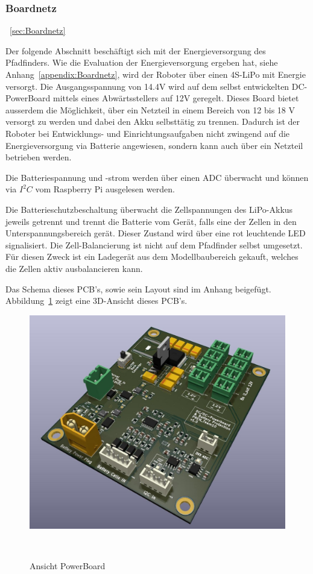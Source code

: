 \documentclass[main.tex]{subfiles} %
\begin{document}

\subsubsection{Boardnetz}~\ref{sec:Boardnetz}

Der folgende Abschnitt beschäftigt sich mit der Energieversorgung des
Pfadfinders. Wie die Evaluation der Energieversorgung ergeben hat, siehe
Anhang~\ref{appendix:Boardnetz}, wird der Roboter über einen 4S-LiPo mit
Energie versorgt. Die Ausgangsspannung von 14.4V wird auf dem selbst
entwickelten DC-PowerBoard mittels eines Abwärtsstellers auf 12V geregelt.
Dieses Board bietet ausserdem die Möglichkeit, über ein Netzteil in einem
Bereich von 12 bis 18 V versorgt zu werden und dabei den Akku selbsttätig zu
trennen. Dadurch ist der Roboter bei Entwicklungs- und Einrichtungsaufgaben
nicht zwingend auf die Energieversorgung via Batterie angewiesen, sondern kann
auch über ein Netzteil betrieben werden.

Die Batteriespannung und -strom werden über einen ADC überwacht und können via
$I^2C$ vom Raspberry Pi ausgelesen werden.

Die Batterieschutzbeschaltung überwacht die Zellspannungen des LiPo-Akkus
jeweils getrennt und trennt die Batterie vom Gerät, falls eine der Zellen in
den Unterspannungsbereich gerät. Dieser Zustand wird über eine rot leuchtende
LED signalisiert. Die Zell-Balancierung ist nicht auf dem Pfadfinder selbst
umgesetzt. Für diesen Zweck ist ein Ladegerät aus dem Modellbaubereich gekauft,
welches die Zellen aktiv ausbalancieren kann.

Das Schema dieses PCB's, sowie sein Layout sind im Anhang beigefügt.
Abbildung~\ref{PowerBoard_Ansicht} zeigt eine 3D-Ansicht dieses PCB's.

\begin{figure}[H]
    \centering
    \includegraphics[width = 0.75\linewidth]{fig_Boardnetz/PowerDistributionBoard.jpg}
    \caption{Ansicht PowerBoard}~\label{PowerBoard_Ansicht}
\end{figure}
\end{document}
